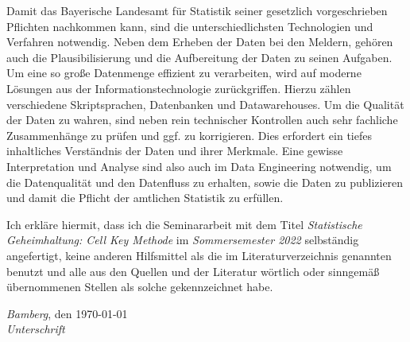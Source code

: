 Damit das Bayerische Landesamt für Statistik seiner gesetzlich vorgeschrieben Pflichten nachkommen kann, sind die unterschiedlichsten Technologien und Verfahren notwendig. Neben dem Erheben der Daten bei den Meldern, gehören auch die Plausibilisierung und die Aufbereitung der Daten zu seinen Aufgaben. Um eine so große Datenmenge effizient zu verarbeiten, wird auf moderne Lösungen aus der Informationstechnologie zurückgriffen. Hierzu zählen verschiedene Skriptsprachen, Datenbanken und Datawarehouses. Um die Qualität der Daten zu wahren, sind neben rein technischer Kontrollen auch sehr fachliche Zusammenhänge zu prüfen und ggf. zu korrigieren. Dies erfordert ein tiefes inhaltliches Verständnis der Daten und ihrer Merkmale. Eine gewisse Interpretation und Analyse sind also auch im Data Engineering notwendig, um die Datenqualität und den Datenfluss zu erhalten, sowie die Daten zu publizieren und damit die Pflicht der amtlichen Statistik zu erfüllen. 


\newpage%

%




\noindent%
Ich erkläre hiermit, dass ich die Seminararbeit mit dem Titel \emph{Statistische Geheimhaltung: Cell Key Methode} im \emph{Sommersemester 2022} selbständig angefertigt, keine anderen Hilfsmittel als die im Literaturverzeichnis genannten benutzt und alle aus den Quellen und der Literatur wörtlich oder sinngemäß übernommenen Stellen als solche gekennzeichnet habe.%
\bigskip
 
\noindent%
\emph{Bamberg}, den \today\\%
\emph{Unterschrift}%

%

